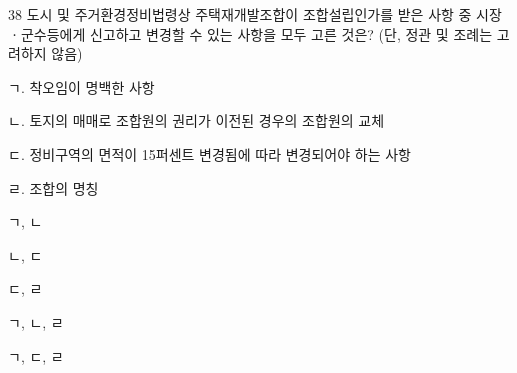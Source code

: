 \begin{question}{38}
도시 및 주거환경정비법령상 주택재개발조합이 조합설립인가를 받은 사항 중 시장ㆍ군수등에게 신고하고 변경할 수 있는 사항을 모두 고른 것은? (단, 정관 및 조례는 고려하지 않음)
\begin{framedtext}
ㄱ. 착오임이 명백한 사항 \par
ㄴ. 토지의 매매로 조합원의 권리가 이전된 경우의 조합원의 교체 \par
ㄷ. 정비구역의 면적이 15퍼센트 변경됨에 따라 변경되어야 하는 사항 \par
ㄹ. 조합의 명칭
\end{framedtext}
\begin{choices}
  \item ㄱ, ㄴ
  \item ㄴ, ㄷ
  \item ㄷ, ㄹ
  \item ㄱ, ㄴ, ㄹ
  \item ㄱ, ㄷ, ㄹ
\end{choices}
\end{question}
